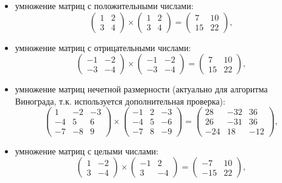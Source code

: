 \documentclass[a4paper,12pt]{article}
\begin{document}
\begin{itemize}
	\item умножение матриц с положительными числами:
	\[ \begin{pmatrix}
	1 & 2 \\
	3 & 4
	\end{pmatrix} \times 
	\begin{pmatrix}
	1 & 2 \\
	3 & 4
	\end{pmatrix} =
	\begin{pmatrix}
	7 & 10 \\
	15 & 22
	\end{pmatrix}, \]
	
	\item умножение матриц с отрицательными числами:
	\[ \begin{pmatrix}
	-1 & -2 \\
	-3 & -4
	\end{pmatrix} \times 
	\begin{pmatrix}
	-1 & -2 \\
	-3 & -4
	\end{pmatrix} =
	\begin{pmatrix}
	7 & 10 \\
	15 & 22
	\end{pmatrix}, \]
	
	\item умножение матриц нечетной размерности
	(актуально для алгоритма Винограда, т.к.
	используется дополнительная проверка):
	\[ \begin{pmatrix}
	1 & -2 & -3 \\
	-4 & 5 & 6 \\
	-7 & -8 & 9 
	\end{pmatrix} \times 
	\begin{pmatrix}
	-1 & 2 & -3 \\
	-4 & 5 & -6 \\
	-7 & 8 & -9 
	\end{pmatrix} =
	\begin{pmatrix}
	28 & -32 &  36 \\
	26 & -31 &  36 \\
	-24 & 18 & -12
	\end{pmatrix}, \]
	
	\item умножение матриц с целыми числами:
	\[ \begin{pmatrix}
	1 & -2 \\
	3 & -4
	\end{pmatrix} \times 
	\begin{pmatrix}
	-1 & 2 \\
	3 & -4
	\end{pmatrix} =
	\begin{pmatrix}
	-7 & 10 \\
	-15 & 22
	\end{pmatrix}, \]
	

\end{itemize}
\end{document}
